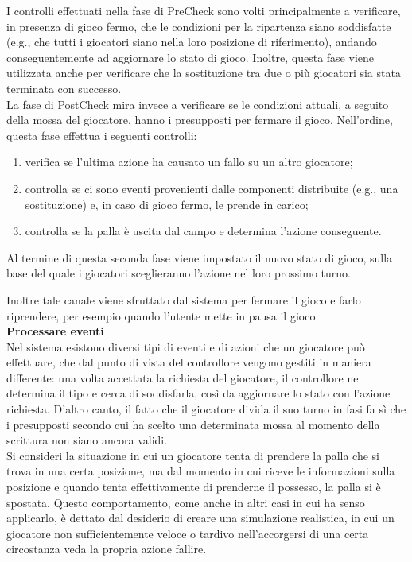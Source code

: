 I controlli effettuati nella fase di PreCheck sono volti principalmente a verificare, in presenza di gioco fermo, che le condizioni per la ripartenza siano soddisfatte (e.g., che tutti i giocatori siano nella loro posizione di riferimento), andando conseguentemente ad aggiornare lo stato di gioco. Inoltre, questa fase viene utilizzata anche per verificare che la sostituzione tra due o più giocatori sia stata terminata con successo.\\

La fase di PostCheck mira invece a verificare se le condizioni attuali, a seguito della mossa del giocatore, hanno i presupposti per fermare il gioco. Nell'ordine, questa fase effettua i seguenti controlli:

\begin{enumerate}
	\item verifica se l'ultima azione ha causato un fallo su un altro giocatore;
	\item controlla se ci sono eventi provenienti dalle componenti distribuite (e.g., una sostituzione) e, in caso di gioco fermo, le prende in carico;
	\item controlla se la palla è uscita dal campo e determina l'azione conseguente.
\end{enumerate}

Al termine di questa seconda fase viene impostato il nuovo stato di gioco, sulla base del quale i giocatori sceglieranno l'azione nel loro prossimo turno.

Inoltre tale canale viene sfruttato dal sistema per fermare il gioco e farlo riprendere, per esempio quando l'utente mette in pausa il gioco.\\

\textbf{Processare eventi}\\

Nel sistema esistono diversi tipi di eventi e di azioni che un giocatore può effettuare, che dal punto di vista del controllore vengono gestiti in maniera differente: una volta accettata la richiesta del giocatore, il controllore ne determina il tipo e cerca di soddisfarla, così da aggiornare lo stato con l'azione richiesta. D'altro canto, il fatto che il giocatore divida il suo turno in fasi fa sì che i presupposti secondo cui ha scelto una determinata mossa al momento della scrittura non siano ancora validi.\\

Si consideri la situazione in cui un giocatore tenta di prendere la palla che si trova in una certa posizione, ma dal momento in cui riceve le informazioni sulla posizione e quando tenta effettivamente di prenderne il possesso, la palla si è spostata. Questo comportamento, come anche in altri casi in cui ha senso applicarlo, è dettato dal desiderio di creare una simulazione realistica, in cui un giocatore non sufficientemente veloce o tardivo nell'accorgersi di una certa circostanza veda la propria azione fallire.\\

